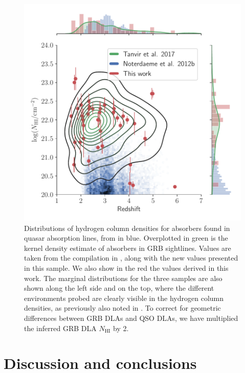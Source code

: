 \documentclass[longauth]{aa}    %
\begin{document}
\begin{figure}[!t]
	\centering \includegraphics[width=\columnwidth]{figures/NH_dist.pdf}
\caption{Distributions of hydrogen column densities for absorbers found in
	quasar absorption lines, from \citet{Noterdaeme2012b} in blue. Overplotted in
	green is the kernel density estimate of absorbers in GRB sightlines. Values are
	taken from the compilation in \citet{Tanvir2017}, along with the new
	values presented in this sample. We also show in the red the values derived in
	this work. The marginal distributions for the three samples are also shown
	along the left side and on the top, where the different environments probed are
	clearly visible in the hydrogen column densities, as previously also noted in
	\citet{Fynbo2009}. To correct for geometric differences between GRB DLAs and QSO DLAs, we have multiplied the inferred GRB DLA $N_{\mathrm{HI}}$ by 2.} \label{fig:NH_dist}
\end{figure}



\section{Discussion and conclusions}\label{conclusions}
\end{document}
